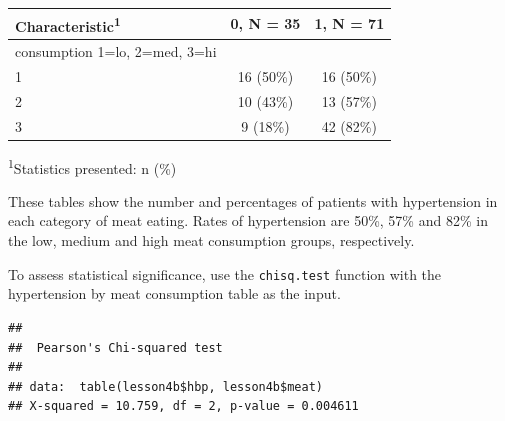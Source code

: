 \documentclass[]{book}
\newenvironment{Shaded}{\begin{snugshade}}{\end{snugshade}}
\newcommand{\DataTypeTok}[1]{\textcolor[rgb]{0.13,0.29,0.53}{#1}}
\newcommand{\KeywordTok}[1]{\textcolor[rgb]{0.13,0.29,0.53}{\textbf{#1}}}
\newcommand{\NormalTok}[1]{#1}
\newcommand{\OperatorTok}[1]{\textcolor[rgb]{0.81,0.36,0.00}{\textbf{#1}}}
\newcommand{\OtherTok}[1]{\textcolor[rgb]{0.56,0.35,0.01}{#1}}
\newcommand{\StringTok}[1]{\textcolor[rgb]{0.31,0.60,0.02}{#1}}
\begin{document}
\begin{Shaded}
\end{Shaded}

\captionsetup[table]{labelformat=empty,skip=1pt}
\begin{longtable}{lcc}
\toprule
\textbf{Characteristic}\textsuperscript{1} & \textbf{0}, N = 35 & \textbf{1}, N = 71 \\ 
\midrule
consumption 1=lo, 2=med, 3=hi &  &  \\ 
1 & 16 (50\%) & 16 (50\%) \\ 
2 & 10 (43\%) & 13 (57\%) \\ 
3 & 9 (18\%) & 42 (82\%) \\ 
\bottomrule
\end{longtable}
\vspace{-5mm}
\begin{minipage}{\linewidth}
\textsuperscript{1}Statistics presented: n (\%) \\ 
\end{minipage}

These tables show the number and percentages of patients with hypertension in each category of meat eating. Rates of hypertension are 50\%, 57\% and 82\% in the low, medium and high meat consumption groups, respectively.

To assess statistical significance, use the \texttt{chisq.test} function with the hypertension by meat consumption table as the input.

\begin{Shaded}
\end{Shaded}

\begin{verbatim}
## 
##  Pearson's Chi-squared test
## 
## data:  table(lesson4b$hbp, lesson4b$meat)
## X-squared = 10.759, df = 2, p-value = 0.004611
\end{verbatim}
\end{document}
